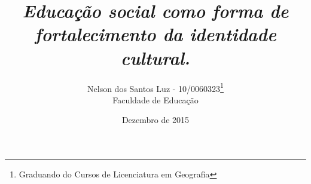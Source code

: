 \title{\textbf{\textit{Educação social como forma de fortalecimento da identidade cultural.}}}
\author{Nelson dos Santos Luz - 10/0060323\thanks{Graduando do Cursos de Licenciatura em Geografia}\\Faculdade de Educação}
\date{Dezembro de 2015}

